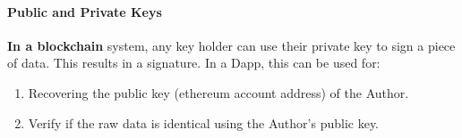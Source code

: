 	
	\paragraph{Public and Private Keys}
	 \textbf{In a blockchain} system, any key holder can use their private key to sign a piece of data. This results in a signature.  
	  In a Dapp, this can be used for:
	 \begin{enumerate}
		\item Recovering the public key (ethereum account address) of the Author.
		\item Verify if the raw data is identical  using the Author's public key. 
	\end{enumerate}
	
	
	
	
	
		 


